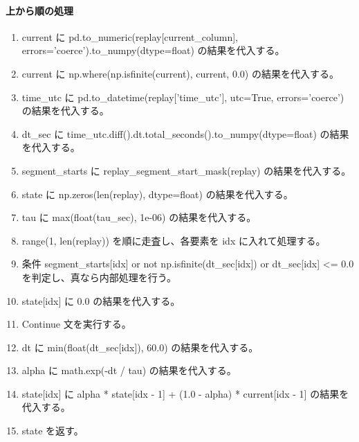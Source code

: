 \documentclass[a4paper,11pt]{article}
\begin{document}
            \paragraph{上から順の処理}
            \begin{enumerate}[leftmargin=1.8em]
            \item current に pd.to\_numeric(replay[current\_column], errors='coerce').to\_numpy(dtype=float) の結果を代入する。
\item current に np.where(np.isfinite(current), current, 0.0) の結果を代入する。
\item time\_utc に pd.to\_datetime(replay['time\_utc'], utc=True, errors='coerce') の結果を代入する。
\item dt\_sec に time\_utc.diff().dt.total\_seconds().to\_numpy(dtype=float) の結果を代入する。
\item segment\_starts に replay\_segment\_start\_mask(replay) の結果を代入する。
\item state に np.zeros(len(replay), dtype=float) の結果を代入する。
\item tau に max(float(tau\_sec), 1e-06) の結果を代入する。
\item range(1, len(replay)) を順に走査し、各要素を idx に入れて処理する。
\item   条件 segment\_starts[idx] or not np.isfinite(dt\_sec[idx]) or dt\_sec[idx] <= 0.0 を判定し、真なら内部処理を行う。
\item     state[idx] に 0.0 の結果を代入する。
\item     Continue 文を実行する。
\item   dt に min(float(dt\_sec[idx]), 60.0) の結果を代入する。
\item   alpha に math.exp(-dt / tau) の結果を代入する。
\item   state[idx] に alpha * state[idx - 1] + (1.0 - alpha) * current[idx - 1] の結果を代入する。
\item state を返す。
            \end{enumerate}
\end{document}
